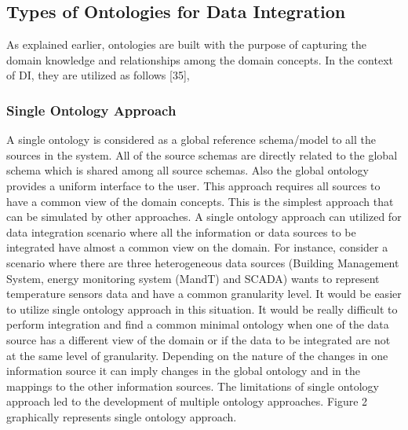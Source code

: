\subsection{Types of Ontologies for Data Integration}
As explained earlier, ontologies are built with the purpose of capturing the
domain knowledge and relationships among the domain concepts. In the context of DI, they are utilized as follows [35],
\subsubsection{Single Ontology Approach}
A single ontology is considered as a global reference schema/model to all the
sources in the system. All of the source schemas are directly related to the global schema which is shared among all source schemas. 
Also the global ontology provides a uniform interface to the user. 
This approach requires all sources to have a common view of the domain concepts. 
This is the simplest approach that can be simulated by other approaches. 
A single ontology approach can utilized for data integration scenario where all
the information or data sources to be integrated have almost a common view on
the domain. 
For instance, consider a scenario where there are three heterogeneous data
sources (Building Management System, energy monitoring system (MandT) and SCADA)
wants to represent temperature sensors data and have a common granularity level. 
It would be easier to utilize single ontology approach in this situation. 
It would be really difficult to perform integration and find a common minimal ontology when one of the data source has a different view of the domain or if the data to be integrated are not at the same level of granularity. Depending on the nature of the changes in one information source it can imply changes in the global ontology and in the mappings to the other information sources. The limitations of single ontology approach led to the development of multiple ontology approaches. Figure 2 graphically represents single ontology approach.
